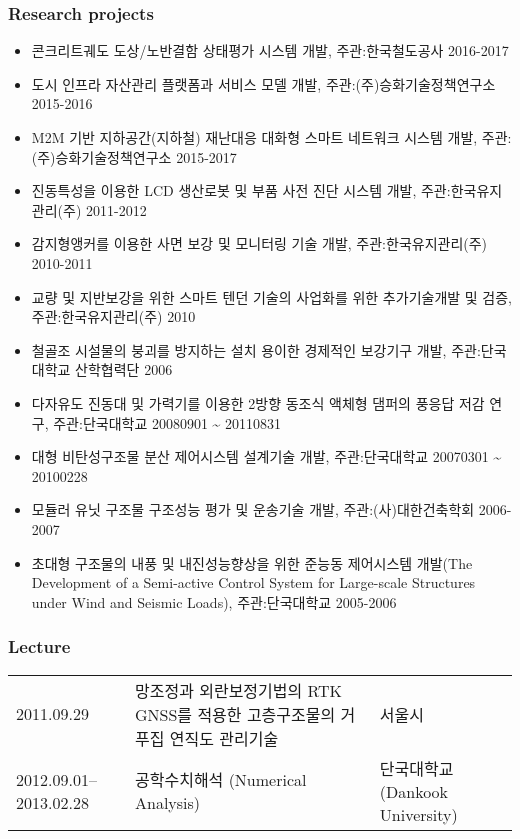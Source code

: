 \subsubsection{Research projects}
\begin{itemize}
\item[] 콘크리트궤도 도상/노반결함 상태평가 시스템 개발, 주관:한국철도공사 2016-2017
\item[] 도시 인프라 자산관리 플랫폼과 서비스 모델 개발, 주관:(주)승화기술정책연구소 2015-2016
\item[] M2M 기반 지하공간(지하철) 재난대응 대화형 스마트 네트워크 시스템 개발, 주관:(주)승화기술정책연구소 2015-2017
\item[]
  진동특성을 이용한 LCD 생산로봇 및 부품 사전 진단 시스템 개발, 주관:한국유지관리(주) 2011-2012
\item[]
  감지형앵커를 이용한 사면 보강 및 모니터링 기술 개발,
  주관:한국유지관리(주) 2010-2011
\item[]
  교량 및 지반보강을 위한 스마트 텐던 기술의 사업화를 위한 추가기술개발
  및 검증, 주관:한국유지관리(주) 2010
\item[]
  철골조 시설물의 붕괴를 방지하는 설치 용이한 경제적인 보강기구 개발,
  주관:단국대학교 산학협력단 2006
\item[]
  다자유도 진동대 및 가력기를 이용한 2방향 동조식 액체형 댐퍼의 풍응답
  저감 연구, 주관:단국대학교 20080901 \textasciitilde{} 20110831
\item[]
  대형 비탄성구조물 분산 제어시스템 설계기술 개발, 주관:단국대학교
  20070301 \textasciitilde{} 20100228
\item[] 모듈러 유닛 구조물 구조성능 평가 및 운송기술 개발, 주관:(사)대한건축학회 2006-2007
\item[] 초대형 구조물의 내풍 및 내진성능향상을 위한 준능동 제어시스템 개발(The Development of a Semi-active Control System for Large-scale Structures under Wind and Seismic Loads), 주관:단국대학교 2005-2006
\end{itemize}

\subsubsection*{Lecture}

\begin{tabularx}{\textwidth}{p{}XX}
    2011.09.29 & 망조정과 외란보정기법의 RTK GNSS를 적용한 고층구조물의 거푸집 연직도 관리기술 & 서울시 \\
    2012.09.01--2013.02.28 & 공학수치해석 (Numerical Analysis) & 단국대학교 (Dankook University)\\
\end{tabularx}

